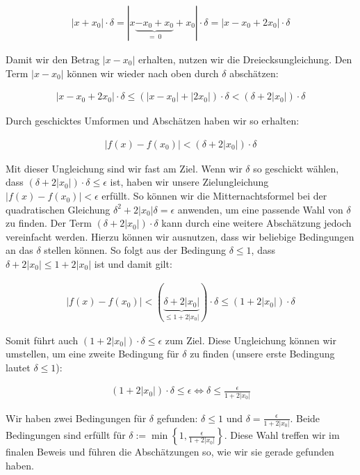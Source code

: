 \documentclass[fontsize=9pt,
               parskip=half-,
               DIV=14,
               listof=chapterentry,
               tocflat]{scrbook}
\begin{document}
\begin{solutionprocess*}
\begin{align*}
|x+x_{0}|\cdot \delta =|x\underbrace {-x_{0}+x_{0}} _{=\ 0}+x_{0}|\cdot \delta =|x-x_{0}+2x_{0}|\cdot \delta 
\end{align*}

Damit wir den Betrag $|x-x_{0}|$ erhalten, nutzen wir die Dreiecksungleichung. Den Term $|x-x_{0}|$ können wir wieder nach oben durch $\delta $ abschätzen:

\begin{align*}
|x-x_{0}+2x_{0}|\cdot \delta \leq (|x-x_{0}|+|2x_{0}|)\cdot \delta <(\delta +2|x_{0}|)\cdot \delta 
\end{align*}

Durch geschicktes Umformen und Abschätzen haben wir so erhalten:

\begin{align*}
|f(x)-f(x_{0})|<(\delta +2|x_{0}|)\cdot \delta 
\end{align*}

Mit dieser Ungleichung sind wir fast am Ziel. Wenn wir $\delta $ so geschickt wählen, dass $(\delta +2|x_{0}|)\cdot \delta \leq \epsilon $ ist, haben wir unsere Zielungleichung $|f(x)-f(x_{0})|<\epsilon $ erfüllt. So können wir die Mitternachtsformel bei der quadratischen Gleichung $\delta ^{2}+2|x_{0}|\delta =\epsilon $ anwenden, um eine passende Wahl von $\delta $ zu finden. Der Term $(\delta +2|x_{0}|)\cdot \delta $ kann durch eine weitere Abschätzung jedoch vereinfacht werden. Hierzu können wir ausnutzen, dass wir beliebige Bedingungen an das $\delta $ stellen können. So folgt aus der Bedingung $\delta \leq 1$, dass $\delta +2|x_{0}|\leq 1+2|x_{0}|$ ist und damit gilt:

\begin{align*}
|f(x)-f(x_{0})|<(\underbrace {\delta +2|x_{0}|} _{\leq 1+2|x_{0}|})\cdot \delta \leq (1+2|x_{0}|)\cdot \delta 
\end{align*}

Somit führt auch $(1+2|x_{0}|)\cdot \delta \leq \epsilon $ zum Ziel. Diese Ungleichung können wir umstellen, um eine zweite Bedingung für $\delta $ zu finden (unsere erste Bedingung lautet $\delta \leq 1$):

\begin{align*}
(1+2|x_{0}|)\cdot \delta \leq \epsilon \iff \delta \leq {\frac {\epsilon }{1+2|x_{0}|}}
\end{align*}

Wir haben zwei Bedingungen für $\delta $ gefunden: $\delta \leq 1$ und $\delta ={\tfrac {\epsilon }{1+2|x_{0}|}}$. Beide Bedingungen sind erfüllt für $\delta :=\min \left\{1,{\tfrac {\epsilon }{1+2|x_{0}|}}\right\}$. Diese Wahl treffen wir im finalen Beweis und führen die Abschätzungen so, wie wir sie gerade gefunden haben.

\end{solutionprocess*}
\end{document}
